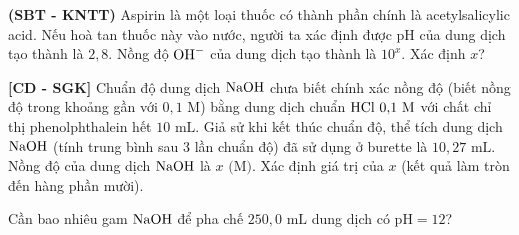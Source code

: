 \documentclass[12pt,a4paper]{article}
\begin{document}
\begin{ex}
\textbf{(SBT - KNTT)} Aspirin là một loại thuốc có thành phần chính là acetylsalicylic acid. Nếu hoà tan thuốc này vào nước, người ta xác định được pH của dung dịch tạo thành là $2{,}8$. Nồng độ $\ce{OH-}$ của dung dịch tạo thành là $10^x$. Xác định $x$?

\end{ex}

\begin{ex}
\textbf{[CD - SGK]} Chuẩn độ dung dịch $\ce{NaOH}$ chưa biết chính xác nồng độ (biết nồng độ trong khoảng gần với $0{,}1\text{ M}$) bằng dung dịch chuẩn $\ce{HCl}\ 0{,}1\text{ M}$ với chất chỉ thị phenolphthalein hết $10\text{ mL}$. Giả sử khi kết thúc chuẩn độ, thể tích dung dịch $\ce{NaOH}$ (tính trung bình sau 3 lần chuẩn độ) đã sử dụng ở burette là $10{,}27\text{ mL}$. Nồng độ của dung dịch $\ce{NaOH}$ là $x\text{ (M)}$. Xác định giá trị của $x$ (kết quả làm tròn đến hàng phần mười).

\end{ex}

\begin{ex}
Cần bao nhiêu gam $\ce{NaOH}$ để pha chế $250{,}0\text{ mL}$ dung dịch có $\text{pH} = 12$?

\end{ex}
\end{document}
